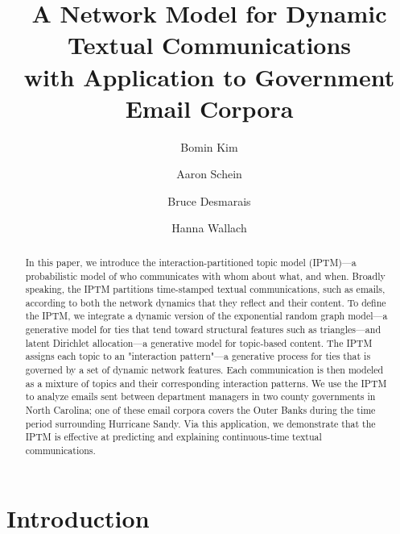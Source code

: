 \documentclass[a4paper]{article}
\title{A Network Model for Dynamic Textual Communications \\with Application to
	Government Email Corpora}
\author[1]{Bomin Kim}
\author[3]{Aaron Schein}
\author[1]{Bruce Desmarais}
\author[2,3]{Hanna Wallach}
\affil[1]{Pennsylvania State University}
\affil[2]{Microsoft Research NYC}
\affil[3]{University of Massachusetts Amherst}
\begin{document}
\maketitle
\begin{abstract}
	
	\noindent In this paper, we introduce the interaction-partitioned topic model
	(IPTM)---a probabilistic model of who communicates with whom about
	what, and when. Broadly speaking, the IPTM partitions time-stamped
	textual communications, such as emails, according to both the network
	dynamics that they reflect and their content. To define the IPTM, we
	integrate a dynamic version of the exponential random graph model---a
	generative model for ties that tend toward structural features such as
	triangles---and latent Dirichlet allocation---a generative model for
	topic-based content. The IPTM assigns each topic to an "interaction
	pattern"---a generative process for ties that is governed by a set of
	dynamic network features. Each communication is then modeled as a
	mixture of topics and their corresponding interaction patterns. We use
	the IPTM to analyze emails sent between department managers in two
	county governments in North Carolina; one of these email corpora
	covers the Outer Banks during the time period surrounding Hurricane
	Sandy. Via this application, we demonstrate that the IPTM is effective
	at predicting and explaining continuous-time textual communications.
\end{abstract}
\section{Introduction} \label{sec: Introduction}
\end{document}
